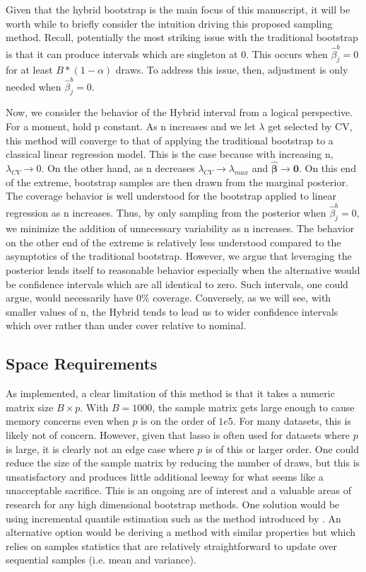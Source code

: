 Given that the hybrid bootstrap is the main focus of this manuscript, it will be worth while to briefly consider the intuition driving this proposed sampling method. Recall, potentially the most striking issue with the traditional bootstrap is that it can produce intervals which are singleton at 0. This occurs when $\hat{\beta}_j^b = 0$ for at least $B * (1 - \alpha)$ draws. To address this issue, then, adjustment is only needed when $\hat{\beta}_j^{b} = 0$. 

Now, we consider the behavior of the Hybrid interval from a logical perspective. For a moment, hold p constant. As n increases and we let $\lambda$ get selected by CV, this method will converge to that of applying the traditional bootstrap to a classical linear regression model. This is the case because with increasing n, $\lambda_{CV} \rightarrow 0$. On the other hand, as n decreases $\lambda_{CV} \rightarrow \lambda_{max}$ and $\hat{\boldsymbol{\beta}}\rightarrow \boldsymbol{0}$. On this end of the extreme, bootstrap samples are then drawn from the marginal posterior. The coverage behavior is well understood for the bootstrap applied to linear regression as n increases. Thus, by only sampling from the posterior when $\hat{\beta}_j^b = 0$, we minimize the addition of unnecessary variability as n increases. The behavior on the other end of the extreme is relatively less understood compared to the asymptotics of the traditional bootstrap. However, we argue that leveraging the posterior lends itself to reasonable behavior especially when the alternative would be confidence intervals which are all identical to zero. Such intervals, one could argue, would necessarily have 0\% coverage. Conversely, as we will see, with smaller values of n, the Hybrid tends to lead us to wider confidence intervals which over rather than under cover relative to nominal.

\subsection{Space Requirements}

As implemented, a clear limitation of this method is that it takes a numeric matrix size $B \times p$. With $B = 1000$, the sample matrix gets large enough to cause memory concerns even when $p$ is on the order of $1e5$. For many datasets, this is likely not of concern. However, given that lasso is often used for datasets where $p$ is large, it is clearly not an edge case where $p$ is of this or larger order. One could reduce the size of the sample matrix by reducing the number of draws, but this is unsatisfactory and produces little additional leeway for what seems like a unacceptable sacrifice. This is an ongoing are of interest and a valuable areas of research for any high dimensional bootstrap methods. One solution would be using incremental quantile estimation such as the method introduced by \cite{Tierney1983}. An alternative option would be deriving a method with similar properties but which relies on samples statistics that are relatively straightforward to update over sequential samples (i.e. mean and variance).
